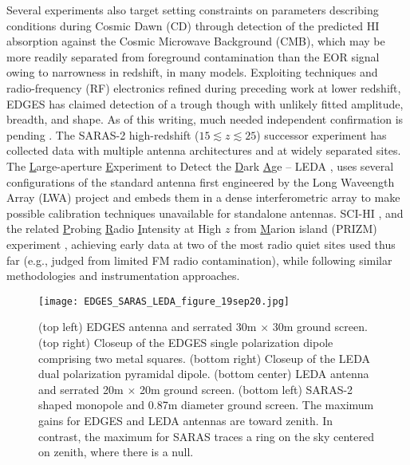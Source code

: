 Several experiments also target setting constraints on parameters describing conditions during Cosmic Dawn (CD) through detection of the predicted HI absorption against the Cosmic Microwave Background (CMB), which may be more readily separated from foreground contamination than the EOR signal owing to narrowness in redshift, in many models.  Exploiting techniques and radio-frequency (RF) electronics refined during  preceding work at lower redshift, EDGES has claimed detection of a trough \cite{bowman18} though with unlikely fitted amplitude, breadth, and shape.  As of this writing, much needed independent confirmation is pending \cite{greenhill18,hills18,bradley19,spinelli19}.  The SARAS-2 high-redshift ($15\lesssim z \lesssim 25$) successor experiment \cite{singh17,singh18} has collected data with multiple antenna architectures and at widely separated sites.  The {\underline L}arge-aperture {\underline E}xperiment to Detect the {\underline D}ark {\underline A}ge -- LEDA \cite{greenhill12,price18}, uses several configurations of the standard antenna first engineered by the Long Waveength Array (LWA) project \cite{taylor12} and embeds them in a dense interferometric array to make possible calibration techniques  unavailable for standalone antennas.  SCI-HI \cite{voytek14}, and  the related {\underline P}robing {\underline R}adio {\underline I}ntensity at High $z$ from {\underline M}arion island (PRIZM) experiment \cite{philip19}, achieving early data at two of the most radio quiet sites used thus far (e.g., judged from limited FM radio contamination), while following similar methodologies and instrumentation approaches.
\
\begin{figure}[htb]
\begin{center}
\hspace*{-0.15in}\texttt{[image: EDGES\_SARAS\_LEDA\_figure\_19sep20.jpg]}
\end{center}
\caption{(top left) EDGES antenna and serrated 30m $\times$ 30m ground screen.  (top right) Closeup of the EDGES single polarization dipole comprising two metal squares.  (bottom right) Closeup of the LEDA dual polarization pyramidal dipole.  (bottom center) LEDA antenna and serrated 20m $\times$ 20m ground screen. (bottom left) SARAS-2 shaped monopole and 0.87m diameter ground screen.  The maximum gains for EDGES and LEDA antennas are toward zenith.  In contrast, the maximum for SARAS traces a ring on the sky centered on zenith, where there is a null.}
\end{figure}

